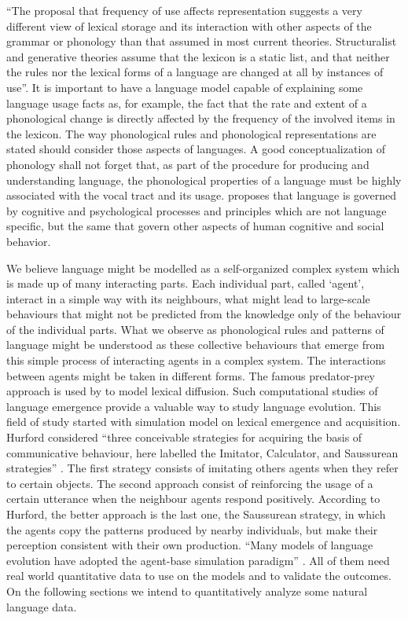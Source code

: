 ``The proposal that frequency of use affects representation suggests a very different view of lexical storage 
and its interaction with other aspects of the grammar or phonology than that assumed in most current theories. 
Structuralist and generative theories assume that the lexicon is a static list, and that neither the rules nor 
the lexical forms of a language are changed at all by instances of use''\citep{bybee2003}. 
It is important to have a language model capable of explaining some language usage facts as, for example, 
the fact that the rate and extent of a phonological change is directly affected by the frequency of the 
involved items in the lexicon. The way phonological rules and phonological representations are stated should 
consider those aspects of languages. A good conceptualization of phonology shall not forget that, 
as part of the procedure for producing and understanding language, the phonological properties of a language 
must be highly associated with the vocal tract and its usage. \cite{bybee2003} proposes that language is governed 
by cognitive and psychological processes and principles which are not language specific, but the same that govern 
other aspects of human cognitive and social behavior.

We believe language might be modelled as a self-organized complex system which is made up of many interacting parts.
Each individual part, called `agent', interact in a simple way with its neighbours, what might lead to large-scale
behaviours that might not be predicted from the knowledge only of the behaviour of the individual parts.  
What we observe as phonological rules and patterns of language might be understood as these collective behaviours 
that emerge from this simple process of interacting agents in a complex system. The interactions between agents might
be taken in different forms. The famous predator-prey approach is used by \cite{wang2004} to model lexical diffusion.
Such computational studies of language emergence provide a valuable way to study language evolution. This field of
study started with \cite{hurford89} simulation model on lexical emergence and acquisition. Hurford considered 
``three conceivable strategies for acquiring the basis of communicative behaviour, here labelled the Imitator, 
Calculator, and Saussurean strategies'' \citep{hurford89}. The first strategy consists of imitating others agents
when they refer to certain objects. The second approach consist of reinforcing the usage of a certain utterance 
when the neighbour agents respond positively. According to Hurford, the better approach is the last one, the
Saussurean strategy, in which the agents copy the patterns produced by nearby individuals, but make their perception
consistent with their own production. ``Many models of language evolution have adopted the agent-base simulation
paradigm'' \citep{wang2004}. All of them need real world quantitative data to use on the models and to validate
the outcomes. On the following sections we intend to quantitatively analyze some natural language data.


